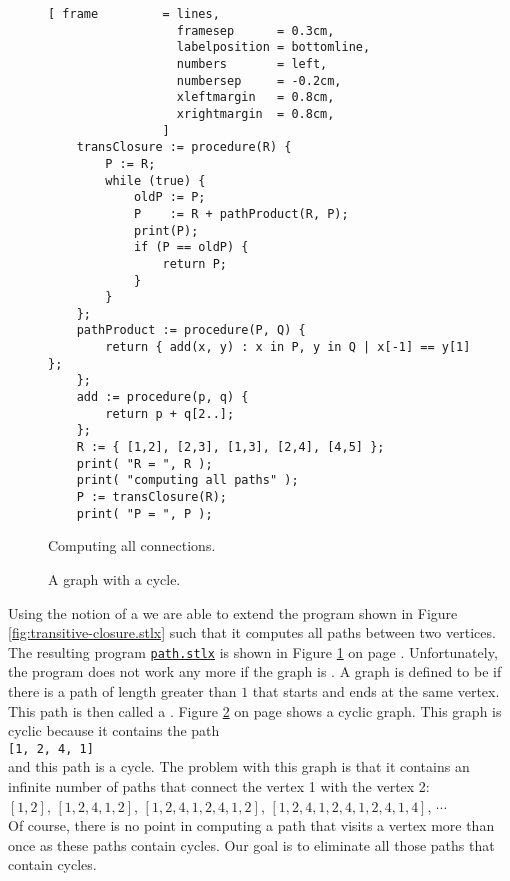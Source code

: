 \begin{figure}[!ht]
  \centering
\begin{Verbatim}[ frame         = lines, 
                  framesep      = 0.3cm, 
                  labelposition = bottomline,
                  numbers       = left,
                  numbersep     = -0.2cm,
                  xleftmargin   = 0.8cm,
                  xrightmargin  = 0.8cm,
                ]
    transClosure := procedure(R) {
        P := R;
        while (true) {
            oldP := P;
            P    := R + pathProduct(R, P);
            print(P);
            if (P == oldP) {
                return P;
            }
        }
    };
    pathProduct := procedure(P, Q) {
        return { add(x, y) : x in P, y in Q | x[-1] == y[1] };
    };    
    add := procedure(p, q) {
        return p + q[2..];
    };
    R := { [1,2], [2,3], [1,3], [2,4], [4,5] };
    print( "R = ", R );
    print( "computing all paths" );
    P := transClosure(R);
    print( "P = ", P );
\end{Verbatim} 
\vspace*{-0.3cm}
\caption{Computing all connections.}  \label{fig:path.stlx}
\end{figure} %

\begin{figure}[!ht]
  \centering
  \vspace*{-9cm}

  \vspace*{-1cm}

  \caption{A graph with a cycle.}
  \label{fig:graph-zykl}
\end{figure}

Using the notion of a  we are able to extend the program shown in Figure
\ref{fig:transitive-closure.stlx} such that it computes all paths between two vertices.
The resulting program
\href{https://github.com/karlstroetmann/Logik/blob/master/SetlX/path.stlx}{\texttt{path.stlx}}
is shown in Figure \ref{fig:path.stlx} on page \pageref{fig:path.stlx}.
Unfortunately, the program does not work any more if the graph is .  A graph is defined
to be  if there is a path of length greater than $1$ that starts and ends at the same
vertex.  This path is then called a .
Figure \ref{fig:graph-zykl} on page \pageref{fig:graph-zykl} shows a cyclic graph.  This graph is
cyclic because it contains the path
\\[0.2cm]
\hspace*{1.3cm}
\texttt{[1, 2, 4, 1]}
\\[0.2cm]
and this path is a cycle.
The problem with this graph is that it contains an infinite number of paths that connect the vertex
1 with the vertex 2: \\[0.2cm]
\hspace*{1.3cm}
$[ 1, 2 ]$, $[ 1, 2, 4, 1, 2 ]$, 
$[ 1, 2, 4, 1, 2, 4, 1, 2 ]$, 
$[ 1, 2, 4, 1, 2, 4, 1, 2, 4, 1, 4 ]$, $\cdots$
\\[0.2cm]
Of course, there is no point in computing a path that visits a vertex more than once as these paths
contain cycles.  Our goal is to eliminate all those paths that contain cycles.


